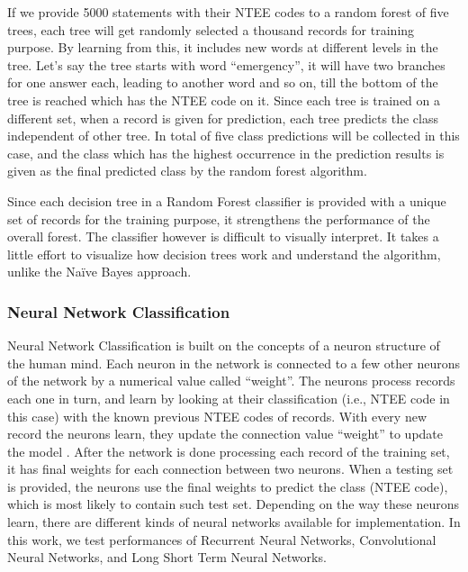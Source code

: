 \documentclass[12pt]{article}
\begin{document}
If we provide 5000 statements with their NTEE codes to a random forest of five trees, each tree will get randomly selected a thousand records for training purpose. By learning from this, it includes new words at different levels in the tree. Let's say the tree starts with word ``emergency'', it will have two branches for one answer each, leading to another word and so on, till the bottom of the tree is reached which has the NTEE code on it. Since each tree is trained on a different set, when a record is given for prediction, each tree predicts the class independent of other tree. In total of five class predictions will be collected in this case, and the class which has the highest occurrence in the prediction results is given as the final predicted class by the random forest algorithm. 

Since each decision tree in a Random Forest classifier is provided with a unique set of records for the training purpose, it strengthens the performance of the overall forest. The classifier however is difficult to visually interpret. It takes a little effort to visualize how decision trees work and understand the algorithm, unlike the Na\"ive Bayes approach.

\subsubsection{Neural Network Classification}


Neural Network Classification is built on the concepts of a neuron structure of the human mind. Each neuron in the network is connected to a few other neurons of the network by a numerical value called ``weight''. The neurons process records each one in turn, and learn by looking at their classification (i.e., NTEE code in this case) with the known previous NTEE codes of records. With every new record the neurons learn, they update the connection value ``weight'' to update the model \parencites[163]{collobert2008unified}. After the network is done processing each record of the training set, it has final weights for each connection between two neurons. When a testing set is provided, the neurons use the final weights to predict the class (NTEE code), which is most likely to contain such test set. Depending on the way these neurons learn, there are different kinds of neural networks available for implementation. In this work, we test performances of Recurrent Neural Networks, Convolutional Neural Networks, and Long Short Term Neural Networks.
\end{document}
